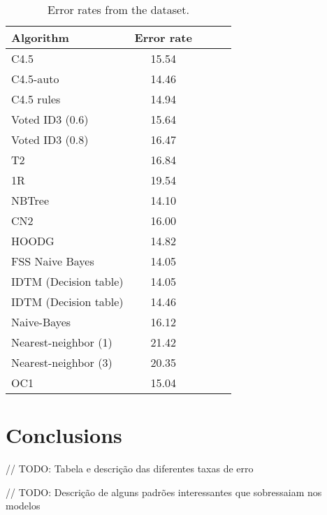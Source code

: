\documentclass[a4paper]{llncs}
\begin{document}
\begin{table}[ht]
  \begin{center}
  \begin{tabular}{ | l | c | c | c | c |}
    \hline
    \textbf{Algorithm} & \textbf{Error rate} \\ \hline
    C4.5 & 15.54 \\ \hline
    C4.5-auto & 14.46 \\ \hline
    C4.5 rules & 14.94 \\ \hline
    Voted ID3 (0.6) & 15.64 \\ \hline
    Voted ID3 (0.8) & 16.47 \\ \hline
    T2 & 16.84 \\ \hline
    1R & 19.54 \\ \hline
    NBTree & 14.10 \\ \hline
    CN2 & 16.00 \\ \hline
    HOODG & 14.82 \\ \hline
    FSS Naive Bayes & 14.05 \\ \hline
    IDTM (Decision table) & 14.05 \\ \hline
    IDTM (Decision table) & 14.46 \\ \hline
    Naive-Bayes & 16.12 \\ \hline
    Nearest-neighbor (1) & 21.42 \\ \hline
    Nearest-neighbor (3) & 20.35 \\ \hline
    OC1 & 15.04 \\ \hline
  \end{tabular}
  \caption{Error rates from the dataset.}
  \label{tbl:dataset_error_rates}
  \end{center}
\end{table}

\section{Conclusions}

// TODO: Tabela e descrição das diferentes taxas de erro

// TODO: Descrição de alguns padrões interessantes que sobressaiam nos modelos
\end{document}

